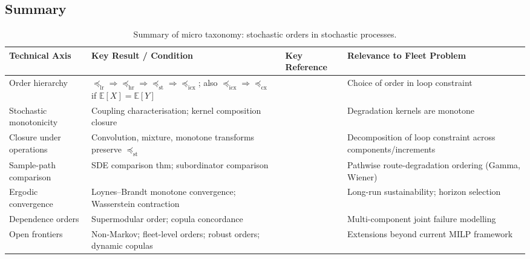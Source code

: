 \documentclass[11pt,a4paper]{article}
\theoremstyle{plain}
\theoremstyle{definition}
\theoremstyle{remark}
\begin{document}
\subsection*{Summary}
\label{sec:micro:summary_text}


\begin{table}[htbp]
\centering
\caption{Summary of micro taxonomy: stochastic orders in stochastic processes.}
\label{tab:micro_summary}
\small
\begin{tabular}{@{} p{3.2cm} p{4.0cm} p{2.5cm} p{4.0cm} @{}}
\toprule
\textbf{Technical Axis} & \textbf{Key Result / Condition} & \textbf{Key Reference} & \textbf{Relevance to Fleet Problem} \\
\midrule
Order hierarchy &
  $\preceq_{\mathrm{lr}} \Rightarrow \preceq_{\mathrm{hr}} \Rightarrow \preceq_{\mathrm{st}} \Rightarrow \preceq_{\mathrm{icx}}$; also $\preceq_{\mathrm{icx}} \Rightarrow \preceq_{\mathrm{cx}}$ if $\mathbb{E}[X]=\mathbb{E}[Y]$ &
  \cite{shaked2007} &
  Choice of order in loop constraint \\
\addlinespace
Stochastic monotonicity &
  Coupling characterisation; kernel composition closure &
  \cite{daley1968,kamae1977} &
  Degradation kernels are monotone \\
\addlinespace
Closure under operations &
  Convolution, mixture, monotone transforms preserve $\preceq_{\mathrm{st}}$ &
  \cite{shaked2007,muller2002} &
  Decomposition of loop constraint across components/increments \\
\addlinespace
Sample-path comparison &
  SDE comparison thm; subordinator comparison &
  \cite{ikeda1977,lindvall2002} &
  Pathwise route-degradation ordering (Gamma, Wiener) \\
\addlinespace
Ergodic convergence &
  Loynes--Brandt monotone convergence; Wasserstein contraction &
  \cite{loynes1962,brandt1986,hairer2011} &
  Long-run sustainability; horizon selection \\
\addlinespace
Dependence orders &
  Supermodular order; copula concordance &
  \cite{joe2015,ruschendorf2013} &
  Multi-component joint failure modelling \\
\addlinespace
Open frontiers &
  Non-Markov; fleet-level orders; robust orders; dynamic copulas &
  \cite{barrettdonald2003,wiesemann2014} &
  Extensions beyond current MILP framework \\
\bottomrule
\end{tabular}
\end{table}
\end{document}
